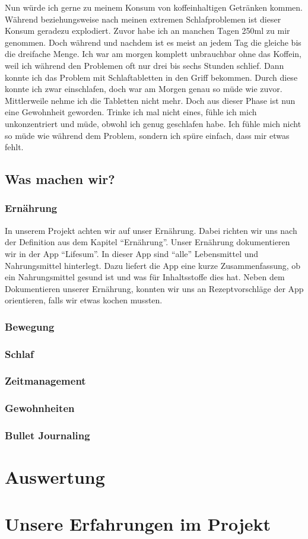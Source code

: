Nun würde ich gerne zu meinem Konsum von koffeinhaltigen Getränken kommen. Während beziehungsweise nach meinen extremen Schlafproblemen ist dieser Konsum geradezu explodiert. Zuvor habe ich an manchen Tagen 250ml zu mir genommen. Doch während und nachdem ist es meist an jedem Tag die gleiche bis die dreifache Menge. Ich war am morgen komplett unbrauchbar ohne das Koffein, weil ich während den Problemen oft nur drei bis sechs Stunden schlief. Dann konnte ich das Problem mit Schlaftabletten in den Griff bekommen. Durch diese konnte ich zwar einschlafen, doch war am Morgen genau so müde wie zuvor. Mittlerweile nehme ich die Tabletten nicht mehr. Doch aus dieser Phase ist nun eine Gewohnheit geworden. Trinke ich mal nicht eines, fühle ich mich unkonzentriert und müde, obwohl ich genug geschlafen habe. Ich fühle mich nicht so müde wie während dem Problem, sondern ich spüre einfach, dass mir etwas fehlt.
\subsection{Was machen wir?}
\subsubsection{Ernährung}
In unserem Projekt achten wir auf unser Ernährung. Dabei richten wir uns nach der Definition aus dem Kapitel “Ernährung”.
\newline
Unser Ernährung dokumentieren wir in der App “Lifesum”. In dieser App sind “alle” Lebensmittel und Nahrungsmittel hinterlegt. Dazu liefert die App eine kurze Zusammenfassung, ob ein Nahrungsmittel gesund ist und was für Inhaltsstoffe dies hat. Neben dem Dokumentieren unserer Ernährung, konnten wir uns an Rezeptvorschläge der App orientieren, falls wir etwas kochen mussten.
\subsubsection{Bewegung}
\subsubsection{Schlaf}
\subsubsection{Zeitmanagement}
\subsubsection{Gewohnheiten}
\subsubsection{Bullet Journaling}
\section{Auswertung}
\section{Unsere Erfahrungen im Projekt}